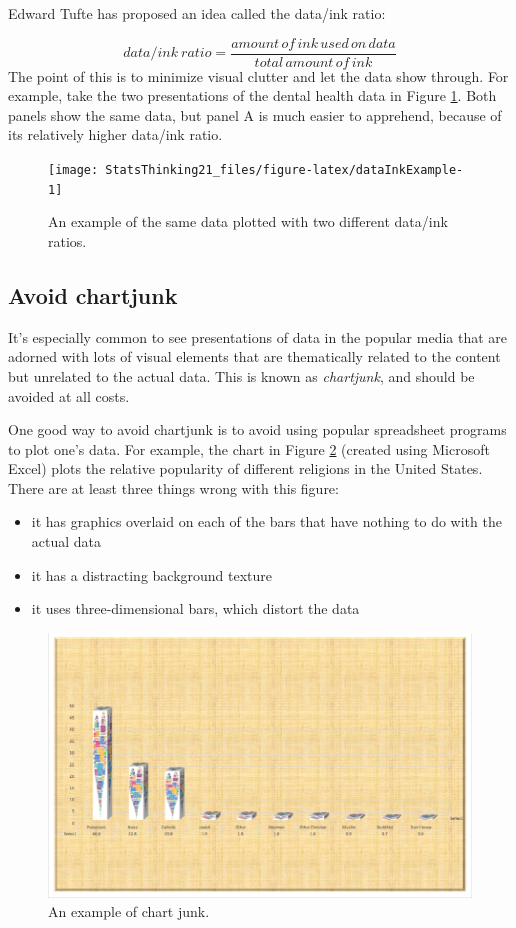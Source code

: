 \documentclass[12pt,]{book}
\providecommand{\tightlist}{%
  \setlength{\itemsep}{0pt}\setlength{\parskip}{0pt}}
\theoremstyle{definition}
\theoremstyle{definition}
\theoremstyle{definition}
\theoremstyle{remark}
\begin{document}
Edward Tufte has proposed an idea called the data/ink ratio:

\[
data/ink\ ratio = \frac{amount\, of\, ink\, used\, on\, data}{total\, amount\, of\, ink}
\]
The point of this is to minimize visual clutter and let the data show through. For example, take the two presentations of the dental health data in Figure \ref{fig:dataInkExample}. Both panels show the same data, but panel A is much easier to apprehend, because of its relatively higher data/ink ratio.

\begin{figure}
\texttt{[image: StatsThinking21\_files/figure-latex/dataInkExample-1]} \caption{An example of the same data plotted with two different data/ink ratios.}\label{fig:dataInkExample}
\end{figure}

\hypertarget{avoid-chartjunk}{%
\subsection{Avoid chartjunk}\label{avoid-chartjunk}}

It's especially common to see presentations of data in the popular media that are adorned with lots of visual elements that are thematically related to the content but unrelated to the actual data. This is known as \emph{chartjunk}, and should be avoided at all costs.

One good way to avoid chartjunk is to avoid using popular spreadsheet programs to plot one's data. For example, the chart in Figure \ref{fig:chartJunk} (created using Microsoft Excel) plots the relative popularity of different religions in the United States. There are at least three things wrong with this figure:

\begin{itemize}
\tightlist
\item
  it has graphics overlaid on each of the bars that have nothing to do with the actual data
\item
  it has a distracting background texture
\item
  it uses three-dimensional bars, which distort the data
\end{itemize}

\begin{figure}
\includegraphics[width=0.8\linewidth,height=0.5\textheight]{images/excel_chartjunk} \caption{An example of chart junk.}\label{fig:chartJunk}
\end{figure}
\end{document}
